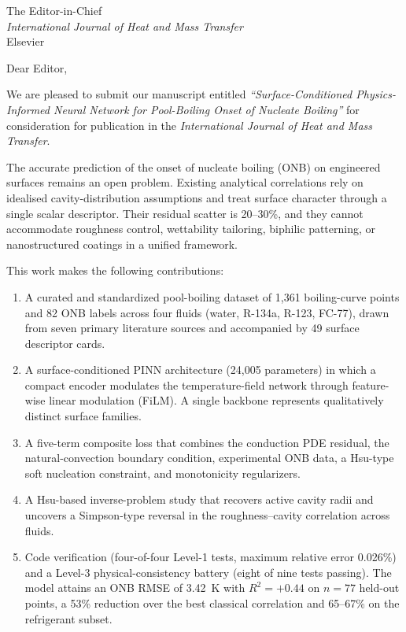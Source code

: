 \documentclass[11pt,a4paper]{letter}
\begin{document}
\begin{letter}{The Editor-in-Chief\\
\emph{International Journal of Heat and Mass Transfer}\\
Elsevier}

\opening{Dear Editor,}

We are pleased to submit our manuscript entitled \emph{``Surface-Conditioned
Physics-Informed Neural Network for Pool-Boiling Onset of Nucleate
Boiling''} for consideration for publication in the \emph{International
Journal of Heat and Mass Transfer}.

The accurate prediction of the onset of nucleate boiling (ONB) on
engineered surfaces remains an open problem. Existing analytical
correlations rely on idealised cavity-distribution assumptions and treat
surface character through a single scalar descriptor. Their residual
scatter is 20--30\%, and they cannot accommodate roughness control,
wettability tailoring, biphilic patterning, or nanostructured coatings
in a unified framework.

This work makes the following contributions:
\begin{enumerate}
  \item A curated and standardized pool-boiling dataset of 1{,}361
        boiling-curve points and 82 ONB labels across four fluids (water,
        R-134a, R-123, FC-77), drawn from seven primary literature sources
        and accompanied by 49 surface descriptor cards.
  \item A surface-conditioned PINN architecture (24{,}005 parameters) in
        which a compact encoder modulates the temperature-field network
        through feature-wise linear modulation (FiLM). A single backbone
        represents qualitatively distinct surface families.
  \item A five-term composite loss that combines the conduction PDE
        residual, the natural-convection boundary condition, experimental
        ONB data, a Hsu-type soft nucleation constraint, and
        monotonicity regularizers.
  \item A Hsu-based inverse-problem study that recovers active cavity
        radii and uncovers a Simpson-type reversal in the
        roughness--cavity correlation across fluids.
  \item Code verification (four-of-four Level-1 tests, maximum relative
        error 0.026\%) and a Level-3 physical-consistency battery (eight
        of nine tests passing). The model attains an ONB RMSE of
        3.42~K with $R^{2}=+0.44$ on $n=77$ held-out points, a 53\%
        reduction over the best classical correlation and 65--67\% on
        the refrigerant subset.
\end{enumerate}


\end{letter}
\end{document}
